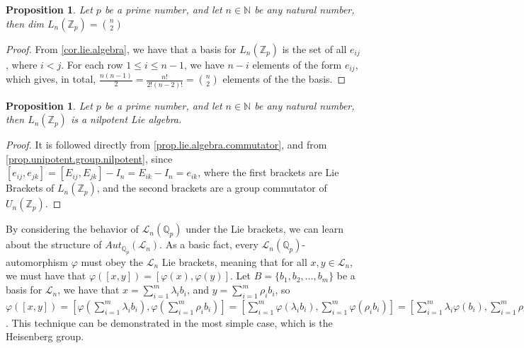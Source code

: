 \documentclass[12pt]{article}
\newtheorem{proposition}[theorem]{Proposition}
\begin{document}
\begin{proposition}
\label{prop.lie.algebra.dimension}
Let $p$ be a prime number, and let $n\in\mathbb{N}$ be any natural number, then dim $L_n(\mathbb{Z}_p)=\binom{n}{2}$
\end{proposition}
\begin{proof}
From \ref{cor.lie.algebra}, we have that a basis for $L_n(\mathbb{Z}_p)$ is the set of all $e_{ij}$, where $i<j$. For each row $1\leq i\leq n-1$, we have $n-i$ elements of the form $e_{ij}$, which gives, in total, $\frac{n(n-1)}{2}=\frac{n!}{2!(n-2)!}=\binom{n}{2}$ elements of the the basis.
\end{proof}
\begin{proposition}
\label{prop.nilpotent.lie.algebra}
Let $p$ be a prime number, and let $n\in\mathbb{N}$ be any natural number, then $L_n(\mathbb{Z}_p)$ is a nilpotent Lie algebra.
\end{proposition}
\begin{proof}
It is followed directly from \ref{prop.lie.algebra.commutator}, and from \ref{prop.unipotent.group.nilpotent}, since $[e_{ij},e_{jk}]=[E_{ij},E_{jk}]-I_n=E_{ik}-I
_n=e_{ik}$, where the first brackets are Lie Brackets of $L_n(\mathbb{Z}_p)$, and the second brackets are a group commutator of $U_n(\mathbb{Z}_p)$.
\end{proof}
By considering the behavior of $\mathcal{L}_n(\mathbb{Q}_p)$ under the Lie brackets, we can learn about the structure of $Aut_{\mathbb{Q}_p}(\mathcal{L}_n)$. As a basic fact, every $\mathcal{L}_n(\mathbb{Q}_p)$-automorphism $\varphi$ must obey the $\mathcal{L}_n$ Lie brackets, meaning that for all $x,y\in\mathcal{L}_n$, we must have that $\varphi([x,y])=[\varphi(x),\varphi(y)]$. Let $B=\{b_1,b_2,\dots,b_m\}$ be a basis for $\mathcal{L}_n$, we have that $x=\sum_{i=1}^m\lambda_i b_i$, and $y=\sum_{i=1}^m\rho_i b_i$, so $\varphi([x,y])=[\varphi(\sum_{i=1}^m\lambda_i b_i),\varphi(\sum_{i=1}^m\rho_i b_i)]=[\sum_{i=1}^m\varphi(\lambda_i b_i),\sum_{i=1}^m\varphi(\rho_i b_i)]=[\sum_{i=1}^m\lambda_i\varphi(b_i),\sum_{i=1}^m\rho_i\varphi(b_i)]=\sum_{i=1}^m\sum_{j=1}^m[\lambda_i\varphi(b_i),\rho_j\varphi(b_j)]=\sum_{i=1}^m\sum_{j=1}^m\lambda_i\rho_j[\varphi(b_i),\varphi(b_j)]$. This technique can be demonstrated in the most simple case, which is the Heisenberg group.
\end{document}
